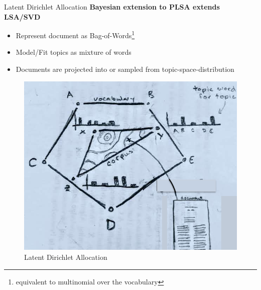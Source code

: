 \documentclass[10pt]{beamer}
\begin{document}
\begin{frame}{Latent Dirichlet Allocation\cite{BleiNg2010}}
  {\bf Bayesian extension to PLSA\cite{DBLP:journals/corr/abs-1301-6705} extends LSA/SVD\cite{deerwester-indexing-1990}}

  \begin{multicols}{2}

  \begin{itemize}
  \item Represent document as Bag-of-Words\footnote{equivalent to multinomial over the vocabulary}
  \item Model/Fit topics as mixture of words
  \item Documents are projected into or sampled from topic-space-distribution
  \end{itemize}

  \begin{figure}
  \includegraphics[width=\columnwidth]{./lda-draw.png}
  \caption{Latent Dirichlet Allocation}
  \end{figure}

  \end{multicols}

\end{frame}
\end{document}
